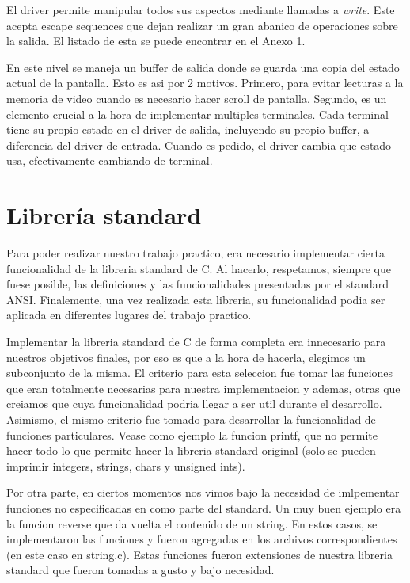 \documentclass[a4paper,10pt]{article}
\begin{document}
            El driver permite manipular todos sus aspectos mediante llamadas a \textit{write}.
            Este acepta escape sequences que dejan realizar un gran abanico de operaciones sobre la salida.
            El listado de esta se puede encontrar en el Anexo 1.
            
            En este nivel se maneja un buffer de salida donde se guarda una copia del estado actual de la pantalla.
            Esto es asi por 2 motivos.
            Primero, para evitar lecturas a la memoria de video cuando es necesario hacer scroll de pantalla.
            Segundo, es un elemento crucial a la hora de implementar multiples terminales.
            Cada terminal tiene su propio estado en el driver de salida, incluyendo su propio buffer, a diferencia del driver de entrada.
            Cuando es pedido, el driver cambia que estado usa, efectivamente cambiando de terminal.
\newpage     
\section{Librería standard}
    Para poder realizar nuestro trabajo practico, era necesario implementar cierta funcionalidad de la libreria standard de C. Al hacerlo, respetamos, siempre que fuese posible, las definiciones y las funcionalidades presentadas por el standard ANSI.
    Finalemente, una vez realizada esta libreria, su funcionalidad podia ser aplicada en diferentes lugares del trabajo practico.

    Implementar la libreria standard de C de forma completa era innecesario para nuestros objetivos finales, por eso es que a la hora de hacerla, elegimos un subconjunto de la misma. El criterio para esta seleccion fue tomar las funciones que eran totalmente necesarias para nuestra implementacion y ademas, otras que creiamos que cuya funcionalidad podria llegar a ser util durante el desarrollo.
    Asimismo, el mismo criterio fue tomado para desarrollar la funcionalidad de funciones particulares. Vease como ejemplo la funcion printf, que no permite hacer todo lo que permite hacer la libreria standard original (solo se pueden imprimir integers, strings, chars y unsigned ints).

    Por otra parte, en ciertos momentos nos vimos bajo la necesidad de imlpementar funciones no especificadas en como parte del standard. Un muy buen ejemplo era la funcion reverse que da vuelta el contenido de un string. En estos casos, se implementaron las funciones y fueron agregadas en los archivos correspondientes (en este caso en string.c). Estas funciones fueron extensiones de nuestra libreria standard que fueron tomadas a gusto y bajo necesidad.
\end{document}
